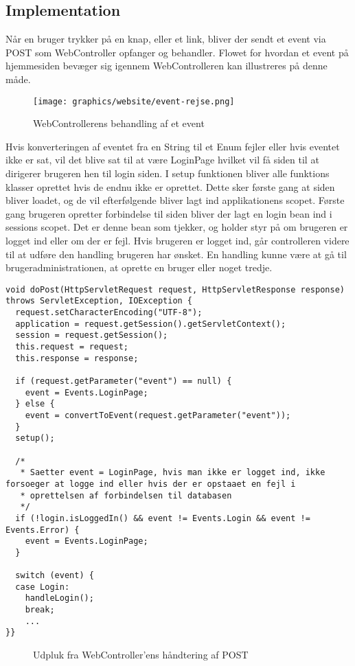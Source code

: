 \documentclass[a4paper]{article}
\newenvironment{changemargin}[2]{%
\begin{list}{}{%
\setlength{\topsep}{0pt}%
\setlength{\leftmargin}{#1}%
\setlength{\rightmargin}{#2}%
\setlength{\listparindent}{\parindent}%
\setlength{\itemindent}{\parindent}%
\setlength{\parsep}{\parskip}%
}%
\item[]}{\end{list}}
\begin{document}

\clearpage
\subsection{Implementation} %

Når en bruger trykker på en knap, eller et link, bliver der sendt et event via POST som WebController opfanger og behandler. Flowet for hvordan et event på hjemmesiden bevæger sig igennem WebControlleren kan illustreres på denne måde. 
 
\begin{figure}[H]
  \centering
  \texttt{[image: graphics/website/event-rejse.png]}
  \caption{WebControllerens behandling af et event}
\end{figure}

Hvis konverteringen af eventet fra en String til et Enum fejler eller hvis eventet ikke er sat, vil det blive sat til at være LoginPage hvilket vil få siden til at dirigerer brugeren hen til login siden. I setup funktionen bliver alle funktions klasser oprettet hvis de endnu ikke er oprettet. Dette sker første gang at siden bliver loadet, og de vil efterfølgende bliver lagt ind applikationens scopet. Første gang brugeren opretter forbindelse til siden bliver der lagt en login bean ind i sessions scopet. Det er denne bean som tjekker, og holder styr på om brugeren er logget ind eller om der er fejl. Hvis brugeren er logget ind, går controlleren videre til at udføre den handling brugeren har ønsket. En handling kunne være at gå til brugeradministrationen, at oprette en bruger eller noget tredje. 

\begin{changemargin}{-1.5cm}{-1.5cm}
\begin{lstlisting}
void doPost(HttpServletRequest request, HttpServletResponse response) throws ServletException, IOException {
  request.setCharacterEncoding("UTF-8");
  application = request.getSession().getServletContext();
  session = request.getSession();
  this.request = request;
  this.response = response;

  if (request.getParameter("event") == null) {
    event = Events.LoginPage;
  } else {
    event = convertToEvent(request.getParameter("event"));
  }
  setup();

  /*
   * Saetter event = LoginPage, hvis man ikke er logget ind, ikke forsoeger at logge ind eller hvis der er opstaaet en fejl i
   * oprettelsen af forbindelsen til databasen
   */
  if (!login.isLoggedIn() && event != Events.Login && event != Events.Error) {
    event = Events.LoginPage;
  }

  switch (event) {
  case Login:
    handleLogin();
    break;
    ...
}}
\end{lstlisting}
\end{changemargin}
\begin{figure}[h!]
  \caption{Udpluk fra WebController'ens håndtering af POST}
\end{figure}
\end{document}
